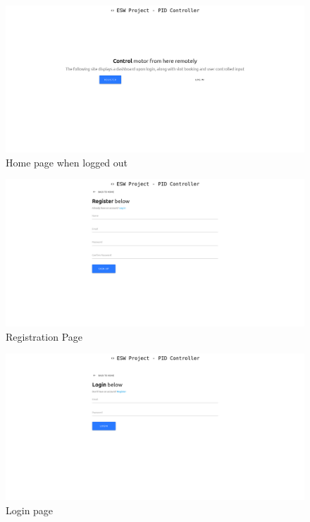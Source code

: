 \documentclass[12pt, a4paper]{article}
\theoremstyle{definition}
\theoremstyle{remark}
\begin{document}
\begin{figure}[!h]
    \centering
    \includegraphics[scale=0.2, frame]{img/1.png}
    \caption{Home page when logged out}
    \label{fig:1}
\end{figure}

\begin{figure}[!h]
    \centering
    \includegraphics[scale=0.2]{img/2.png}
    \caption{Registration Page}
    \label{fig:2}
\end{figure}

\begin{figure}[!h]
    \centering
    \includegraphics[scale=0.2]{img/login.png}
    \caption{Login page}
    \label{fig:3}
\end{figure}
\end{document}
